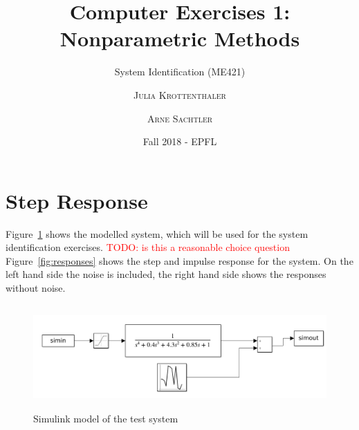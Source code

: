 \documentclass{scrartcl}
\subtitle{System Identification (ME421)}
\title{Computer Exercises 1: Nonparametric Methods}
\author{\textsc{Julia Krottenthaler} \and \textsc{Arne Sachtler}}
\date{Fall 2018 - EPFL}
\begin{document}
\maketitle
\tableofcontents
\section{Step Response}

Figure~\ref{fig:testmodel} shows the modelled system, which will be used for the system identification exercises.
\textcolor{red}{TODO: is this a reasonable choice question}
Figure~\ref{fig:responses} shows the step and impulse response for the system. On the left hand side the noise is included, the right hand side shows the responses without noise.

\begin{figure}[h]
	\centering
	\includegraphics[height=4cm]{figures/systemmodel.png}
	\caption{Simulink model of the test system}\label{fig:testmodel}
\end{figure}
\end{document}
